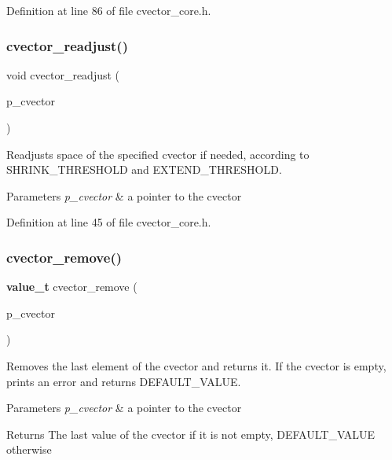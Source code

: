 Definition at line 86 of file cvector\+\_\+core.\+h.

\mbox{\label{cvector__interface_8h_a9461750aa0be3a7104fca3ea80ea26e2}} 
\subsubsection{cvector\+\_\+readjust()}
{\footnotesize\ttfamily void cvector\+\_\+readjust (\begin{DoxyParamCaption}\item[{\textbf{ cvector} $\ast$}]{p\+\_\+cvector }\end{DoxyParamCaption})}

Readjusts space of the specified cvector if needed, according to S\+H\+R\+I\+N\+K\+\_\+\+T\+H\+R\+E\+S\+H\+O\+LD and E\+X\+T\+E\+N\+D\+\_\+\+T\+H\+R\+E\+S\+H\+O\+LD. 
\begin{DoxyParams}{Parameters}
{\em p\+\_\+cvector} & a pointer to the cvector \\
\hline
\end{DoxyParams}


Definition at line 45 of file cvector\+\_\+core.\+h.

\mbox{\label{cvector__interface_8h_a7af2a3f3b2e1fd3f2081536a4d73ac2e}} 
\subsubsection{cvector\+\_\+remove()}
{\footnotesize\ttfamily \textbf{ value\+\_\+t} cvector\+\_\+remove (\begin{DoxyParamCaption}\item[{\textbf{ cvector} $\ast$}]{p\+\_\+cvector }\end{DoxyParamCaption})}

Removes the last element of the cvector and returns it. If the cvector is empty, prints an error and returns D\+E\+F\+A\+U\+L\+T\+\_\+\+V\+A\+L\+UE. 
\begin{DoxyParams}{Parameters}
{\em p\+\_\+cvector} & a pointer to the cvector \\
\hline
\end{DoxyParams}
\begin{DoxyReturn}{Returns}
The last value of the cvector if it is not empty, D\+E\+F\+A\+U\+L\+T\+\_\+\+V\+A\+L\+UE otherwise 
\end{DoxyReturn}


